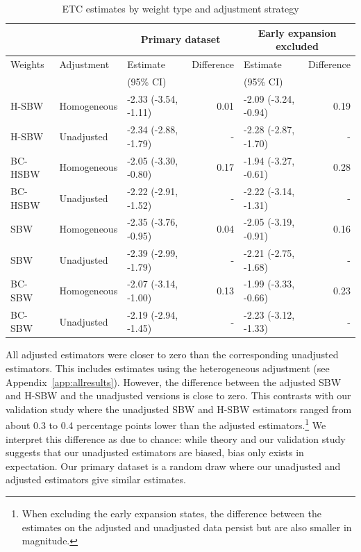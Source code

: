 \documentclass[aoas]{imsart}
\theoremstyle{plain}
\theoremstyle{remark}
\begin{document}
\begin{table}[ht]\caption{ETC estimates by weight type and adjustment strategy}\label{tab:mainresults}
\begin{tabular}{lllrlr} 
\hline
 &  & \multicolumn{2}{c}{Primary dataset} & \multicolumn{2}{c}{Early expansion 
 excluded} \\
  \hline
Weights & Adjustment & Estimate  & Difference & Estimate & Difference\\ 
 &  & (95\% CI) &  & (95\% CI) & \\
  \hline
H-SBW & Homogeneous & -2.33 (-3.54, -1.11) & 0.01 & -2.09 (-3.24, -0.94) & 0.19 \\ 
  H-SBW & Unadjusted & -2.34 (-2.88, -1.79) & - & -2.28 (-2.87, -1.70) & - \\ 
  BC-HSBW & Homogeneous & -2.05 (-3.30, -0.80) & 0.17 & -1.94 (-3.27, -0.61) & 0.28 \\ 
  BC-HSBW & Unadjusted & -2.22 (-2.91, -1.52) & - & -2.22 (-3.14, -1.31) & - \\ 
  SBW & Homogeneous & -2.35 (-3.76, -0.95) & 0.04 & -2.05 (-3.19, -0.91) & 0.16 \\ 
  SBW & Unadjusted & -2.39 (-2.99, -1.79) & - & -2.21 (-2.75, -1.68) & - \\ 
  BC-SBW & Homogeneous & -2.07 (-3.14, -1.00) & 0.13 & -1.99 (-3.33, -0.66) & 0.23 \\ 
  BC-SBW & Unadjusted & -2.19 (-2.94, -1.45) & - & -2.23 (-3.12, -1.33) & - \\    
  \hline
\end{tabular}
\end{table}

All adjusted estimators were closer to zero than the corresponding unadjusted estimators. This includes estimates using the heterogeneous adjustment (see Appendix~\ref{app:allresults}). However, the difference between the adjusted SBW and H-SBW and the unadjusted versions is close to zero. This contrasts with our validation study where the unadjusted SBW and H-SBW estimators ranged from about 0.3 to 0.4 percentage points lower than the adjusted estimators.\footnote{When excluding the early expansion states, the difference between the estimates on the adjusted and unadjusted data persist but are also smaller in magnitude.} We interpret this difference as due to chance: while theory and our validation study suggests that our unadjusted estimators are biased, bias only exists in expectation. Our primary dataset is a random draw where our unadjusted and adjusted estimators give similar estimates.
\end{document}
